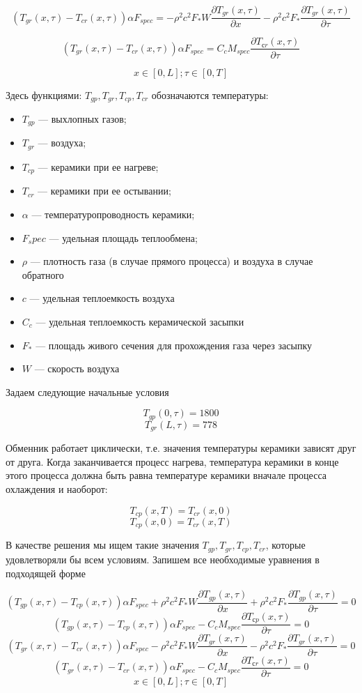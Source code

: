 \documentclass[a4paper,12pt]{article}
\begin{document}
  $$(T_{gr}(x,\tau) - T_{cr}(x,\tau)) \alpha F_{spec} = - \rho^2 c^2 F_* W\frac{\partial T_{gr}(x,\tau)}{\partial x} - \rho^2 c^2 F_*\frac{\partial T_{gr}(x,\tau)}{\partial \tau}$$

  $$(T_{gr}(x,\tau) - T_{cr}(x,\tau))\alpha F_{spec}=  C_c M_{spec} \frac{\partial T_{сr}(x,\tau)}{\partial \tau}$$

  $$x \in [0, L]; \tau \in [0, T]$$

  Здесь функциями: $T_{gp}, T_{gr}, T_{cp}, T_{cr}$ обозначаются температуры:
\begin{itemize}
\item $T_{gp}$ — выхлопных газов;
\item $T_{gr}$ — воздуха;
\item $T_{cp}$ — керамики при ее нагреве;
\item $T_{cr}$ — керамики при ее остывании;
\item $\alpha$ — температуропроводность керамики;
\item $F_spec$ — удельная площадь теплообмена;
\item $\rho$ —  плотность газа (в случае прямого процесса) и воздуха в случае обратного
\item $c$ — удельная теплоемкость воздуха
\item  $C_c$  — удельная теплоемкость керамической засыпки
\item $F_*$ — площадь живого сечения для прохождения газа через засыпку
\item $W$ — скорость воздуха
\end{itemize}

Задаем следующие начальные условия

$$T_{gp}(0,\tau) = 1800$$
$$T_{gr}(L,\tau) = 778$$

Обменник работает циклически, т.е. значения температуры керамики
зависят друг от друга. Когда заканчивается процесс нагрева,
температура керамики в конце этого процесса должна быть равна
температуре керамики вначале процесса охлаждения и наоборот:

$$T_{cp}(x,T) = T_{cr}(x,0)$$
$$T_{cp}(x,0) = T_{cr}(x,T)$$

В качестве решения мы ищем такие значения
$T_{gp}, T_{gr}, T_{cp},T_{cr}$, которые удовлетворяли бы всем условиям.  Запишем все
необходимые уравнения в подходящей форме

$$(T_{gp}(x,\tau) - T_{cp}(x,\tau)) \alpha F_{spec} + \rho^2 c^2 F_* W\frac{\partial T_{gp}(x,\tau)}{\partial x} + \rho^2 c^2 F_*\frac{\partial T_{gp}(x,\tau)}{\partial \tau} = 0$$
$$(T_{gp}(x,\tau) - T_{cp}(x,\tau))\alpha F_{spec} -  C_c M_{spec} \frac{\partial T_{сp}(x,\tau)}{\partial \tau} = 0$$
$$(T_{gr}(x,\tau) - T_{cr}(x,\tau)) \alpha F_{spec} - \rho^2 c^2 F_* W\frac{\partial T_{gr}(x,\tau)}{\partial x} - \rho^2 c^2 F_*\frac{\partial T_{gr}(x,\tau)}{\partial \tau} = 0$$
$$(T_{gr}(x,\tau) - T_{cr}(x,\tau))\alpha F_{spec} -  C_c M_{spec} \frac{\partial T_{сr}(x,\tau)}{\partial \tau} = 0$$
$$x \in [0, L]; \tau \in [0, T]$$
\end{document}
